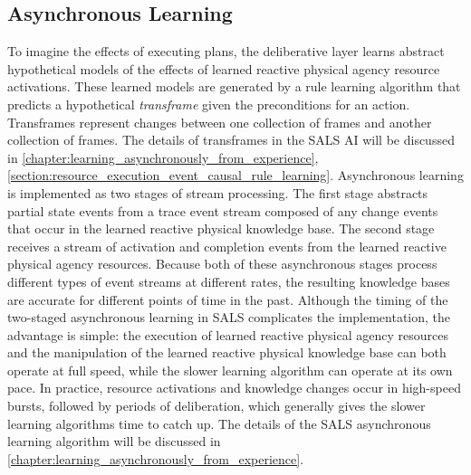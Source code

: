 
\subsection{Asynchronous Learning}

To imagine the effects of executing plans, the deliberative layer
learns abstract hypothetical models of the effects of learned reactive
physical agency resource activations.  These learned models are
generated by a rule learning algorithm that predicts a hypothetical
{\emph{transframe}} \cite[]{minsky:1975} given the preconditions for
an action.  Transframes represent changes between one collection of
frames and another collection of frames.  The details of transframes
in the SALS AI will be discussed in
{\mbox{\autoref{chapter:learning_asynchronously_from_experience}}},
{\mbox{\autoref{section:resource_execution_event_causal_rule_learning}}}.
Asynchronous learning is implemented as two stages of stream
processing.  The first stage abstracts partial state events from a
trace event stream composed of any change events that occur in the
learned reactive physical knowledge base.  The second stage receives a
stream of activation and completion events from the learned reactive
physical agency resources.  Because both of these asynchronous stages
process different types of event streams at different rates, the
resulting knowledge bases are accurate for different points of time in
the past.  Although the timing of the two-staged asynchronous learning
in SALS complicates the implementation, the advantage is simple: the
execution of learned reactive physical agency resources and the
manipulation of the learned reactive physical knowledge base can both
operate at full speed, while the slower learning algorithm can operate
at its own pace.  In practice, resource activations and knowledge
changes occur in high-speed bursts, followed by periods of
deliberation, which generally gives the slower learning algorithms
time to catch up.  The details of the SALS asynchronous learning
algorithm will be discussed in
{\mbox{\autoref{chapter:learning_asynchronously_from_experience}}}.

